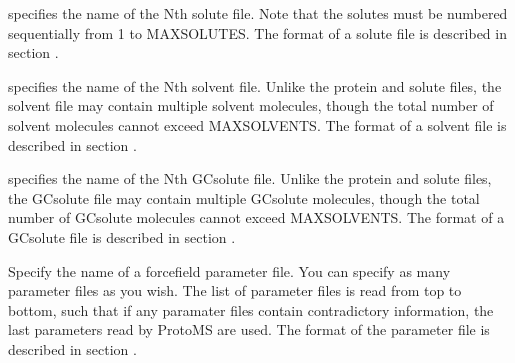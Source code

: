 \documentclass[letterpaper,10pt,english]{sphinxmanual}
\begin{document}
\ignorespaces 
\def\sphinxLiteralBlockLabel{\label{\detokenize{protoms:index-64}}}
%
\begin{sphinxVerbatim}[commandchars=\\\{\}]
 
\end{sphinxVerbatim}

specifies the name of the Nth solute file. Note that the solutes must be numbered sequentially from 1 to MAXSOLUTES. The format of a solute file is described in section {\hyperref[\detokenize{protoms:solpdb}]{}}.

%
\begin{sphinxVerbatim}[commandchars=\\\{\}]
 
\end{sphinxVerbatim}

specifies the name of the Nth solvent file. Unlike the protein and solute files, the solvent file may contain multiple solvent molecules, though the total number of solvent molecules cannot exceed MAXSOLVENTS. The format of a solvent file is described in section {\hyperref[\detokenize{protoms:solventpdb}]{}}.

\ignorespaces 
\def\sphinxLiteralBlockLabel{\label{\detokenize{protoms:index-65}}}
%
\begin{sphinxVerbatim}[commandchars=\\\{\}]
 
\end{sphinxVerbatim}

specifies the name of the Nth GCsolute file. Unlike the protein and solute files, the GCsolute file may contain multiple GCsolute molecules, though the total number of GCsolute molecules cannot exceed MAXSOLVENTS. The format of a GCsolute file is described in section {\hyperref[\detokenize{protoms:gcpdb}]{}}.

\ignorespaces 
\def\sphinxLiteralBlockLabel{\label{\detokenize{protoms:index-66}}}
%
\begin{sphinxVerbatim}[commandchars=\\\{\}]
 
\end{sphinxVerbatim}

Specify the name of a forcefield parameter file. You can specify as many parameter files as you wish. The list of parameter files is read from top to bottom, such that if any paramater files contain contradictory information, the last parameters read by ProtoMS are used. The format of the parameter file is described in section {\hyperref[\detokenize{protoms:parfil}]{}} .
\end{document}
